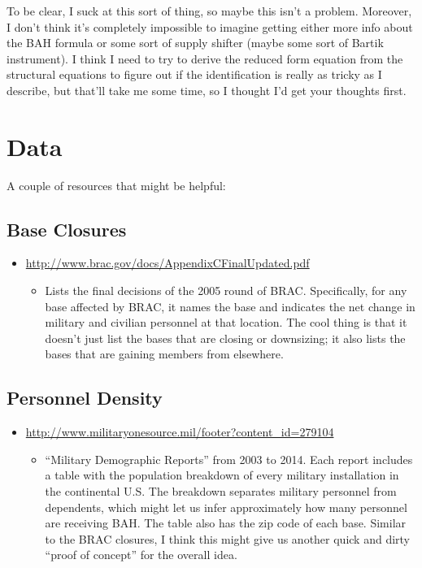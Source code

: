 \documentclass{article}
\begin{document}
To be clear, I suck at this sort of thing, so maybe this isn't a problem. Moreover, I don't think it's completely impossible to imagine getting either more info about the BAH formula or some sort of supply shifter (maybe some sort of Bartik instrument). I think I need to try to derive the reduced form equation from the structural equations to figure out if the identification is really as tricky as I describe, but that'll take me some time, so I thought I'd get your thoughts first.

\section{Data}

A couple of resources that might be helpful:

\subsection{Base Closures}
\begin{itemize}
\item \url{http://www.brac.gov/docs/AppendixCFinalUpdated.pdf}
\begin{itemize}
\item Lists the final decisions of the 2005 round of BRAC. Specifically, for any base affected by BRAC, it names the base and indicates the net change in military and civilian personnel at that location. The cool thing is that it doesn't just list the bases that are closing or downsizing; it also lists the bases that are gaining members from elsewhere. 
\end{itemize}
\end{itemize}

\subsection{Personnel Density}
\begin{itemize}
\item \url{http://www.militaryonesource.mil/footer?content_id=279104}
\begin{itemize}
\item ``Military Demographic Reports'' from 2003 to 2014. Each report includes a table with the population breakdown of every military installation in the continental U.S. The breakdown separates military personnel from dependents, which might let us infer approximately how many personnel are receiving BAH. The table also has the zip code of each base. Similar to the BRAC closures, I think this might give us another quick and dirty ``proof of concept'' for the overall idea.
\end{itemize}
\end{itemize}
\end{document}
